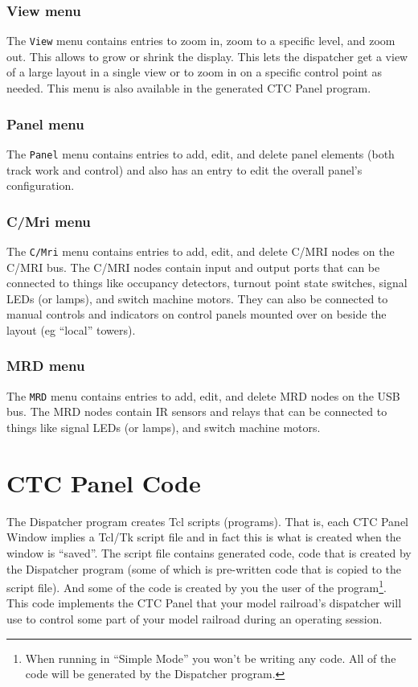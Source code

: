\subsubsection{View menu}

The \verb=View= menu contains entries to zoom in, zoom to a specific
level, and zoom out. This allows to grow or shrink the display.  This
lets the dispatcher get a view of a large layout in a single view or to
zoom in on a specific control point as needed.  This menu is also
available in the generated CTC Panel program.

\subsubsection{Panel menu}

The \verb=Panel= menu contains entries to add, edit, and delete panel
elements (both track work and control) and also has an entry to edit the
overall panel's configuration. 

\subsubsection{C/Mri menu}

The \verb=C/Mri= menu contains entries to add, edit, and delete C/MRI
nodes on the C/MRI bus. The C/MRI nodes contain input and output ports
that can be connected to things like occupancy detectors, turnout point
state switches, signal LEDs (or lamps), and switch machine motors.  They
can also be connected to manual controls and indicators on control
panels mounted over on beside the layout (eg ``local'' towers).


\subsubsection{MRD menu}

The \verb=MRD= menu contains entries to add, edit, and delete MRD nodes
on the USB bus. The MRD nodes contain IR sensors and relays that can be
connected to things like signal LEDs (or lamps), and switch machine
motors.

\section{CTC Panel Code}

The Dispatcher program creates Tcl scripts (programs).  That is, each
CTC Panel Window implies a Tcl/Tk script file and in fact this is what
is created when the window is ``saved''.  The script file contains
generated code, code that is created by the Dispatcher program (some of
which is pre-written code that is copied to the script file). And some
of the code is created by you the user of the program\footnote{When
running in ``Simple Mode'' you won't be writing any code. All of the
code will be generated by the Dispatcher program.}. This code
implements the CTC Panel that your model railroad's dispatcher will use
to control some part of your model railroad during an operating session.

